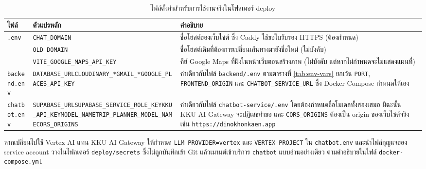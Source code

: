\begin{table}[H]
\caption{ไฟล์ตั้งค่าสำหรับการใช้งานจริงในโฟลเดอร์ deploy}
\label{tab:deploy-env}
\centering
\small
\begin{tabular}{|L{2.8cm}|L{4.3cm}|L{5.3cm}|}
\hline
\textbf{ไฟล์} & \textbf{ตัวแปรหลัก} & \textbf{คำอธิบาย} \\
\hline
\texttt{.env} & \texttt{CHAT\_DOMAIN} & ชื่อโฮสต์ของเว็บไซต์ ซึ่ง Caddy ใช้ขอใบรับรอง HTTPS (ต้องกำหนด) \\
 & \texttt{OLD\_DOMAIN} & ชื่อโฮสต์เดิมที่ต้องการเปลี่ยนเส้นทางมายังชื่อใหม่ (ไม่บังคับ) \\
 & \texttt{VITE\_GOOGLE\_}\allowbreak\texttt{MAPS\_API\_KEY} & คีย์ Google Maps ที่ฝังในหน้าเว็บตอนสร้างภาพ (ไม่บังคับ แต่หากไม่กำหนดจะไม่แสดงแผนที่) \\
\hline
\texttt{backend.env} & \texttt{DATABASE\_URL}\newline\texttt{CLOUDINARY\_*}\newline\texttt{GMAIL\_*}\newline\texttt{GOOGLE\_PLACES\_}\allowbreak\texttt{API\_KEY} & ค่าเดียวกับไฟล์ \texttt{backend/.env} ตามตารางที่ \ref{tab:env-vars} ยกเว้น \texttt{PORT}, \texttt{FRONTEND\_ORIGIN} และ \texttt{CHATBOT\_SERVICE\_URL} ซึ่ง Docker Compose กำหนดให้เอง \\
\hline
\texttt{chatbot.env} & \texttt{SUPABASE\_URL}\newline\texttt{SUPABASE\_SERVICE\_}\allowbreak\texttt{ROLE\_KEY}\newline\texttt{KKU\_API\_KEY}\newline\texttt{MODEL\_NAME}\newline\texttt{TRIP\_PLANNER\_}\allowbreak\texttt{MODEL\_NAME}\newline\texttt{CORS\_ORIGINS} & ค่าเดียวกับไฟล์ \texttt{chatbot-service/.env} โดยต้องกำหนดชื่อโมเดลทั้งสองเสมอ มิฉะนั้น KKU AI Gateway จะปฏิเสธคำขอ และ \texttt{CORS\_ORIGINS} ต้องเป็น origin ของเว็บไซต์จริง เช่น \texttt{https://}\allowbreak\texttt{dinokhonkaen.app} \\
\hline
\end{tabular}
\end{table}

หากเปลี่ยนไปใช้ Vertex AI แทน KKU AI Gateway ให้กำหนด \texttt{LLM\_PROVIDER=vertex} และ \texttt{VERTEX\_PROJECT} ใน \texttt{chatbot.env} และนำไฟล์กุญแจของ service account วางในโฟลเดอร์ \texttt{deploy/secrets} ซึ่งไม่ถูกบันทึกเข้า Git แล้วเมานต์เข้าบริการ \texttt{chatbot} แบบอ่านอย่างเดียว ตามคำอธิบายในไฟล์ \texttt{docker-compose.yml}


